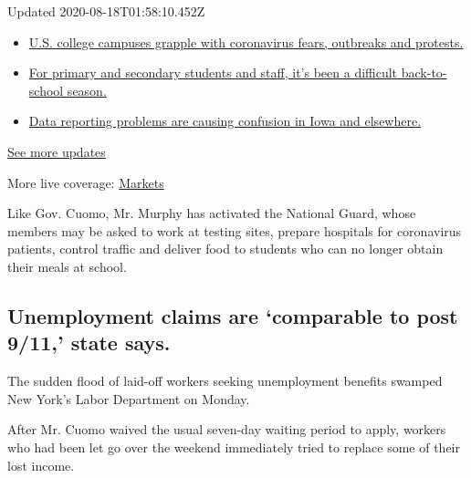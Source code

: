 Updated 2020-08-18T01:58:10.452Z

\begin{itemize}
\tightlist
\item
  \href{https://www.nytimes3xbfgragh.onion/2020/08/17/world/coronavirus-covid.html?action=click\&pgtype=Article\&state=default\&region=MAIN_CONTENT_1\&context=storylines_live_updates\#link-6fdbc8ef}{U.S.
  college campuses grapple with coronavirus fears, outbreaks and
  protests.}
\item
  \href{https://www.nytimes3xbfgragh.onion/2020/08/17/world/coronavirus-covid.html?action=click\&pgtype=Article\&state=default\&region=MAIN_CONTENT_1\&context=storylines_live_updates\#link-12d68713}{For
  primary and secondary students and staff, it's been a difficult
  back-to-school season.}
\item
  \href{https://www.nytimes3xbfgragh.onion/2020/08/17/world/coronavirus-covid.html?action=click\&pgtype=Article\&state=default\&region=MAIN_CONTENT_1\&context=storylines_live_updates\#link-6aa8318c}{Data
  reporting problems are causing confusion in Iowa and elsewhere.}
\end{itemize}

\href{https://www.nytimes3xbfgragh.onion/2020/08/17/world/coronavirus-covid.html?action=click\&pgtype=Article\&state=default\&region=MAIN_CONTENT_1\&context=storylines_live_updates}{See
more updates}

More live coverage:
\href{https://www.nytimes3xbfgragh.onion/live/2020/08/17/business/stock-market-today-coronavirus?action=click\&pgtype=Article\&state=default\&region=MAIN_CONTENT_1\&context=storylines_live_updates}{Markets}

Like Gov. Cuomo, Mr. Murphy has activated the National Guard, whose
members may be asked to work at testing sites, prepare hospitals for
coronavirus patients, control traffic and deliver food to students who
can no longer obtain their meals at school.

\hypertarget{unemployment-claims-are-comparable-to-post-911-state-says}{%
\subsection{Unemployment claims are `comparable to post 9/11,' state
says.}\label{unemployment-claims-are-comparable-to-post-911-state-says}}

The sudden flood of laid-off workers seeking unemployment benefits
swamped New York's Labor Department on Monday.

After Mr. Cuomo waived the usual seven-day waiting period to apply,
workers who had been let go over the weekend immediately tried to
replace some of their lost income.

